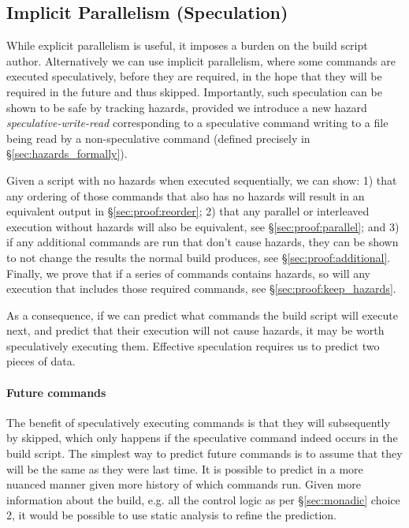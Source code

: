 \subsection{Implicit Parallelism (Speculation)}
\label{sec:speculation}

While explicit parallelism is useful, it imposes a burden on the build script author. Alternatively we can use implicit parallelism, where some commands are executed speculatively, before they are required, in the hope that they will be required in the future and thus skipped. Importantly, such speculation can be shown to be safe by tracking hazards, provided we introduce a new hazard \emph{speculative-write-read} corresponding to a speculative command writing to a file being read by a non-speculative command (defined precisely in \S\ref{sec:hazards_formally}).

Given a script with no hazards when executed sequentially, we can show: 1) that any ordering of those commands that also has no hazards will result in an equivalent output in \S\ref{sec:proof:reorder}; 2) that any parallel or interleaved execution without hazards will also be equivalent, see \S\ref{sec:proof:parallel}; and 3) if any additional commands are run that don't cause hazards, they can be shown to not change the results the normal build produces, see \S\ref{sec:proof:additional}. Finally, we prove that if a series of commands contains hazards, so will any execution that includes those required commands, see \S\ref{sec:proof:keep_hazards}.

As a consequence, if we can predict what commands the build script will execute next, and predict that their execution will not cause hazards, it may be worth speculatively executing them. Effective speculation requires us to predict two pieces of data.

\paragraph{Future commands} The benefit of speculatively executing commands is that they will subsequently by skipped, which only happens if the speculative command indeed occurs in the build script. The simplest way to predict future commands is to assume that they will be the same as they were last time. It is possible to predict in a more nuanced manner given more history of which commands run. Given more information about the build, e.g. all the control logic as per \S\ref{sec:monadic} choice 2, it would be possible to use static analysis to refine the prediction.

